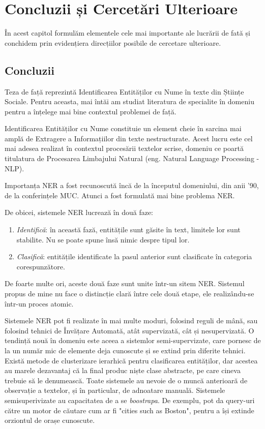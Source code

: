 \chapter{Concluzii și Cercetări Ulterioare}

În acest capitol formulăm elementele cele mai importante ale lucrării de fată și conchidem prin evidențiera direcțiilor posibile de cercetare ulterioare.

\section{Concluzii}

Teza de față reprezintă Identificarea Entităților cu Nume în texte din Științe Sociale. Pentru aceasta, mai întăi am studiat literatura de specialite în domeniu pentru a înțelege mai bine contextul problemei de față.


Identificarea Entităților cu Nume constituie un element cheie în sarcina mai amplă de Extragere a Informațiilor din texte nestructurate. Acest lucru este cel mai adesea realizat în contextul procesării textelor scrise, domeniu ce poartă titulatura de Procesarea Limbajului Natural (eng. Natural Language Processing - NLP).

Importanța NER a fost recunoscută încă de la începutul domeniului, din anii '90, de la conferințele MUC. Atunci a fost formulată mai bine problema NER.

De obicei, sistemele NER lucrează în două faze:

\begin{enumerate}

\item \textit{Identifică}: în această fază, entitățile sunt găsite în text, limitele lor sunt stabilite. Nu se poate spune însă nimic despre tipul lor.
\item \textit{Clasifică}: entitățile identificate la pasul anterior sunt clasificate în categoria corespunzătore.

\end{enumerate}

De foarte multe ori, aceste două faze sunt unite într-un sitem NER. Sistemul propus de mine nu face o distincție clară între cele două etape, ele realizându-se într-un proces atomic.

Sistemele NER pot fi realizate în mai multe moduri, folosind reguli de mână, sau folosind tehnici de Învățare Automată, atât supervizată, cât și nesupervizată. O tendință nouă în domeniu este aceea a sistemlor semi-supervizate, care pornesc de la un număr mic de elemente deja cunoscute și se extind prin diferite tehnici. Există metode de clusterizare ierarhică pentru clasificarea entităților, dar acestea au marele dezavantaj că la final produc niște clase abstracte, pe care cineva trebuie să le denumească. Toate sistemele au nevoie de o muncă anterioară de observație a textelor, și în particular, de adnoatare manuală. Sistemele semisuperivizate au capacitatea de a se \textit{boostrapa}. De exemplu, pot da query-uri către un motor de căutare cum ar fi "cities such as Boston", pentru a își extinde orziontul de orașe cunoscute.


